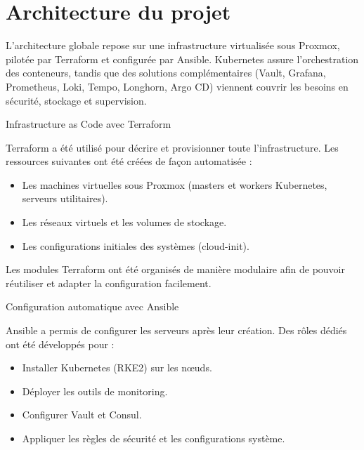 
\section{Architecture du projet}

L'architecture globale repose sur une infrastructure virtualisée sous Proxmox, pilotée par Terraform et configurée par Ansible. Kubernetes assure l'orchestration des conteneurs, tandis que des solutions complémentaires (Vault, Grafana, Prometheus, Loki, Tempo, Longhorn, Argo CD) viennent couvrir les besoins en sécurité, stockage et supervision.


	{Infrastructure as Code avec Terraform}

Terraform a été utilisé pour décrire et provisionner toute l'infrastructure. Les ressources suivantes ont été créées de façon automatisée :

\begin{itemize}
	\item Les machines virtuelles sous Proxmox (masters et workers Kubernetes, serveurs utilitaires).
	\item Les réseaux virtuels et les volumes de stockage.
	\item Les configurations initiales des systèmes (cloud-init).
\end{itemize}

Les modules Terraform ont été organisés de manière modulaire afin de pouvoir réutiliser et adapter la configuration facilement.

	{Configuration automatique avec Ansible}

Ansible a permis de configurer les serveurs après leur création. Des rôles dédiés ont été développés pour :

\begin{itemize}
	\item Installer Kubernetes (RKE2) sur les nœuds.
	\item Déployer les outils de monitoring.
	\item Configurer Vault et Consul.
	\item Appliquer les règles de sécurité et les configurations système.
\end{itemize}


